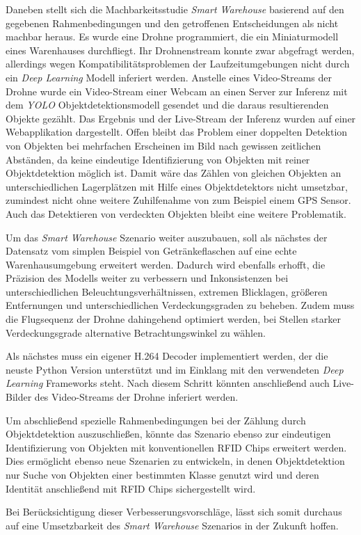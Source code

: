 Daneben stellt sich die Machbarkeitsstudie \textit{Smart Warehouse} basierend auf den gegebenen Rahmenbedingungen und den getroffenen Entscheidungen als nicht machbar heraus. Es wurde eine Drohne programmiert, die ein Miniaturmodell eines Warenhauses durchfliegt. Ihr Drohnenstream konnte zwar abgefragt werden, allerdings wegen Kompatibilitätsproblemen der Laufzeitumgebungen nicht durch ein \textit{Deep Learning} Modell inferiert werden. Anstelle eines Video-Streams der Drohne wurde ein Video-Stream einer Webcam an einen Server zur Inferenz mit dem \textit{YOLO} Objektdetektionsmodell gesendet und die daraus resultierenden Objekte gezählt. Das Ergebnis und der Live-Stream der Inferenz wurden auf einer Webapplikation dargestellt. Offen bleibt das Problem einer doppelten Detektion von Objekten bei mehrfachen Erscheinen im Bild nach gewissen zeitlichen Abständen, da keine eindeutige Identifizierung von Objekten mit reiner Objektdetektion möglich ist. Damit wäre das Zählen von gleichen Objekten an unterschiedlichen Lagerplätzen mit Hilfe eines Objektdetektors nicht umsetzbar, zumindest nicht ohne weitere Zuhilfenahme von zum Beispiel einem GPS Sensor. Auch das Detektieren von verdeckten Objekten bleibt eine weitere Problematik.

Um das \textit{Smart Warehouse} Szenario weiter auszubauen, soll als nächstes der Datensatz vom simplen Beispiel von Getränkeflaschen auf eine echte Warenhausumgebung erweitert werden. Dadurch wird ebenfalls erhofft, die Präzision des Modells weiter zu verbessern und Inkonsistenzen bei unterschiedlichen Beleuchtungsverhältnissen, extremen Blicklagen, größeren Entfernungen und unterschiedlichen Verdeckungsgraden zu beheben. Zudem muss die Flugsequenz der Drohne dahingehend optimiert werden, bei Stellen starker Verdeckungsgrade alternative Betrachtungswinkel zu wählen. 

\newpage

Als nächstes muss ein eigener H.264 Decoder implementiert werden, der die neuste Python Version unterstützt und im Einklang mit den verwendeten \textit{Deep Learning} Frameworks steht. Nach diesem Schritt könnten anschließend auch Live-Bilder des Video-Streams der Drohne inferiert werden.

Um abschließend spezielle Rahmenbedingungen bei der Zählung durch Objektdetektion auszuschließen, könnte das Szenario ebenso zur eindeutigen Identifizierung von Objekten mit konventionellen RFID Chips erweitert werden. Dies ermöglicht ebenso neue Szenarien zu entwickeln, in denen Objektdetektion nur Suche von Objekten einer bestimmten Klasse genutzt wird und deren Identität anschließend mit RFID Chips sichergestellt wird. 

Bei Berücksichtigung dieser Verbesserungsvorschläge, lässt sich somit durchaus auf eine Umsetzbarkeit des \textit{Smart Warehouse} Szenarios in der Zukunft hoffen.
